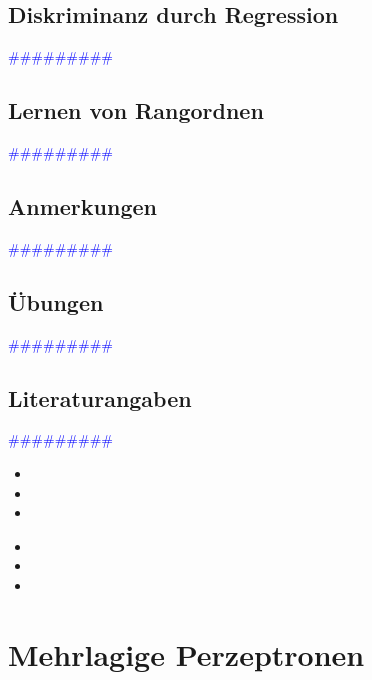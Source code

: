 \documentclass{article}
\begin{document}
  \subsection{Diskriminanz durch Regression} %
      \textcolor{blue}{\#\#\#\#\#\#\#\#\#}
  \subsection{Lernen von Rangordnen} %
      \textcolor{blue}{\#\#\#\#\#\#\#\#\#}
  \subsection{Anmerkungen} %
      \textcolor{blue}{\#\#\#\#\#\#\#\#\#}
  \subsection{Übungen} %
      \textcolor{blue}{\#\#\#\#\#\#\#\#\#}
  \subsection{Literaturangaben} %
      \textcolor{blue}{\#\#\#\#\#\#\#\#\#}

      \begin{itemize}
      \color{red}
        \item
        \item
        \item
      \end{itemize}


      \begin{itemize}
      \color{ForestGreen}
        \item
        \item
        \item
      \end{itemize}




\newpage
\section{Mehrlagige Perzeptronen} %
\end{document}
